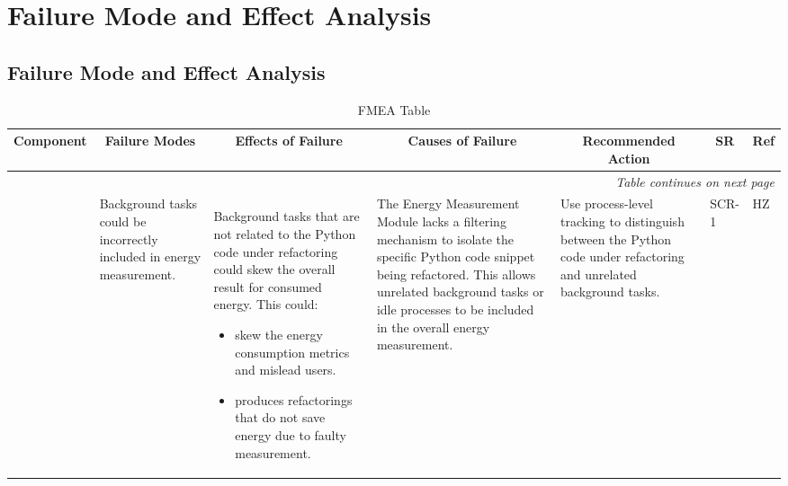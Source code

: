 \documentclass{article}
\newcounter{hazard}
\newcommand{\showmycounter}{\stepcounter{hazard}\thehazard}
\begin{document}
\section{Failure Mode and Effect Analysis}


\begin{landscape}

    \section{Failure Mode and Effect Analysis}
    \centering
    \renewcommand{\arraystretch}{1.5}
    \setlength\LTleft{0pt}
    \setlength\LTright{0pt}
    \begin{longtable}{|p{0.6cm}|p{4cm}p{4cm}p{4cm}p{4cm}p{1.5cm}p{1.5cm}|}
    \caption{FMEA Table}\\\hline
    \toprule \multicolumn{1}{|c}{\textbf{Component}} & \multicolumn{1}{c}{\textbf{Failure Modes}} & \multicolumn{1}{c}{\textbf{Effects of Failure}} & \multicolumn{1}{c}{\textbf{Causes of Failure}} & \multicolumn{1}{c}{\textbf{Recommended Action}} & \multicolumn{1}{c}{\textbf{SR}} & \multicolumn{1}{c|}{\textbf{Ref}}\\\hline
    \endhead
    \hline
    \multicolumn{7}{|r|}{\textit{Table continues on next page}}\\
    \bottomrule
    \endfoot
    \bottomrule
    \endlastfoot
    
    \midrule
    \multicolumn{1}{|c|}{\multirow{10}{*}{\rotatebox[origin=c]{90}{\textbf{Energy Measurement}}}} 
    & Background tasks could be incorrectly included in energy measurement. & 
    Background tasks that are not related to the Python code under refactoring could skew the overall result for consumed energy. This could: \begin{itemize}[wide=0pt]
        \item skew the energy consumption metrics and mislead users. 
        \item produces refactorings that do not save energy due to faulty measurement. 
    \end{itemize} & The Energy Measurement Module lacks a filtering mechanism to isolate the specific Python code snippet being refactored. This allows unrelated background tasks or idle processes to be included in the overall energy measurement. & Use process-level tracking to distinguish between the Python code under refactoring and unrelated background tasks. & SCR-1 & HZ \showmycounter \\ \cline{2-7}
    

\end{longtable}
\end{landscape}
\end{document}
